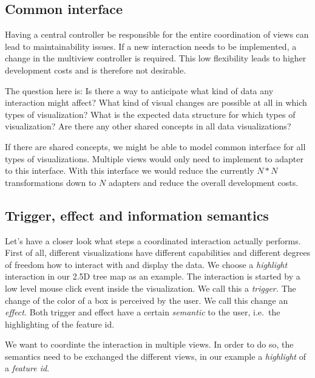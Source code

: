 \documentclass{article}
\newcommand{\tmap}{\textsc{2.5D} tree map}
\begin{document}
\subsection{Common interface}

Having a central controller be responsible for the entire coordination of views can lead to maintainability issues.
If a new interaction needs to be implemented, a change in the multiview controller is required.
This low flexibility leads to higher development costs and is therefore not desirable.

The question here is:
Is there a way to anticipate what kind of data any interaction might affect?
What kind of visual changes are possible at all in which types of visualization?
What is the expected data structure for which types of visualization?
Are there any other shared concepts in all data visualizations?

If there are shared concepts, we might be able to model common interface for all types of visualizations.
Multiple views would only need to implement to adapter to this interface.
With this interface we would reduce the currently $N*N$ transformations down to $N$ adapters and reduce the overall development costs.

\subsection{Trigger, effect and information semantics}

Let's have a closer look what steps a coordinated interaction actually performs.
First of all, different visualizations have different capabilities and different degrees of freedom how to interact with and display the data.
We choose a \emph{highlight} interaction in our \tmap{} as an example.
The interaction is started by a low level mouse click event inside the visualization.
We call this a \emph{trigger.}
The change of the color of a box is perceived by the user.
We call this change an \emph{effect.}
Both trigger and effect have a certain \emph{semantic} to the user, i.e.\ the highlighting of the feature id.

We want to coordinte the interaction in multiple views.
In order to do so, the semantics need to be exchanged the different views, in our example a \emph{highlight} of a \emph{feature id}.
\end{document}
